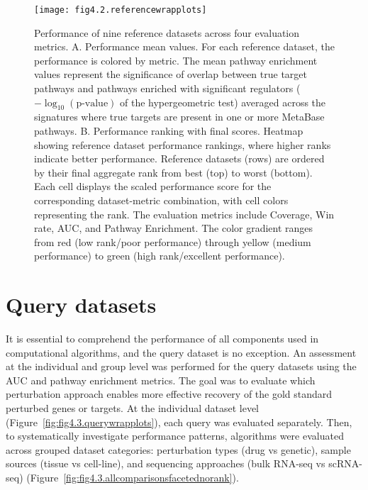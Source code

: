\begin{figure}[htbp]
    \centering
    \texttt{[image: fig4.2.referencewrapplots]}
    \caption[Performance of nine reference datasets across four evaluation metrics.]{Performance of nine reference datasets across four evaluation metrics. A. Performance mean values. For each reference dataset, the performance is colored by metric. The mean pathway enrichment values represent the significance of overlap between true target pathways and pathways enriched with significant regulators ($-\log_{10}(\text{p-value})$ of the hypergeometric test) averaged across the signatures where true targets are present in one or more MetaBase pathways. B. Performance ranking with final scores. Heatmap showing reference dataset performance rankings, where higher ranks indicate better performance. Reference datasets (rows) are ordered by their final aggregate rank from best (top) to worst (bottom). Each cell displays the scaled performance score for the corresponding dataset-metric combination, with cell colors representing the rank. The evaluation metrics include Coverage, Win rate, \gls{AUC}, and Pathway Enrichment. The color gradient ranges from red (low rank/poor performance) through yellow (medium performance) to green (high rank/excellent performance).}
    \label{fig:fig4.2.referencewrapplots}
\end{figure}

\section{Query datasets} %
\label{sec:querydatasetsresults}

It is essential to comprehend the performance of all components used in computational algorithms, and the query dataset is no exception.
An assessment at the individual and group level was performed for the query datasets using the \gls{AUC} and pathway enrichment metrics.
The goal was to evaluate which perturbation approach enables more effective recovery of the gold standard perturbed genes or targets.
At the individual dataset level (Figure~\ref{fig:fig4.3.querywrapplots}), each query was evaluated separately.
Then, to systematically investigate performance patterns, algorithms were evaluated across grouped dataset categories: perturbation types (drug vs genetic), sample sources (tissue vs cell-line), and sequencing approaches (bulk \gls{RNA-seq} vs \gls{scRNA-seq}) (Figure~\ref{fig:fig4.3.allcomparisonsfacetednorank}).

